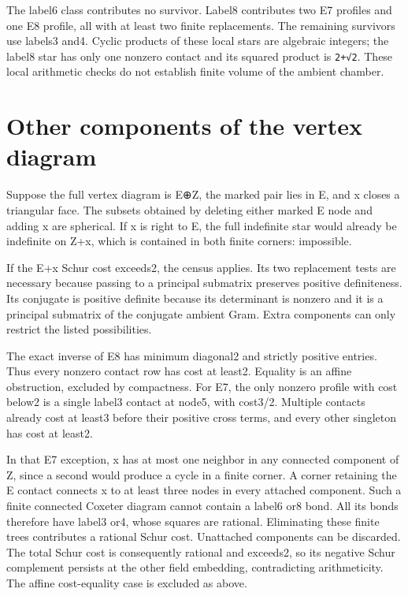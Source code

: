 \documentclass[
  10pt,
]{report}
\begin{document}
The label6 class contributes no survivor. Label8 contributes two E7
profiles and one E8 profile, all with at least two finite replacements.
The remaining survivors use labels3 and4. Cyclic products of these local
stars are algebraic integers; the label8 star has only one nonzero
contact and its squared product is \texttt{2+√2}. These local arithmetic
checks do not establish finite volume of the ambient chamber.

\section{Other components of the vertex
diagram}\label{other-components-of-the-vertex-diagram}

Suppose the full vertex diagram is E⊕Z, the marked pair lies in E, and x
closes a triangular face. The subsets obtained by deleting either marked
E node and adding x are spherical. If x is right to E, the full
indefinite star would already be indefinite on Z+x, which is contained
in both finite corners: impossible.

If the E+x Schur cost exceeds2, the census applies. Its two replacement
tests are necessary because passing to a principal submatrix preserves
positive definiteness. Its conjugate is positive definite because its
determinant is nonzero and it is a principal submatrix of the conjugate
ambient Gram. Extra components can only restrict the listed
possibilities.

The exact inverse of E8 has minimum diagonal2 and strictly positive
entries. Thus every nonzero contact row has cost at least2. Equality is
an affine obstruction, excluded by compactness. For E7, the only nonzero
profile with cost below2 is a single label3 contact at node5, with
cost3/2. Multiple contacts already cost at least3 before their positive
cross terms, and every other singleton has cost at least2.

In that E7 exception, x has at most one neighbor in any connected
component of Z, since a second would produce a cycle in a finite corner.
A corner retaining the E contact connects x to at least three nodes in
every attached component. Such a finite connected Coxeter diagram cannot
contain a label6 or8 bond. All its bonds therefore have label3 or4,
whose squares are rational. Eliminating these finite trees contributes a
rational Schur cost. Unattached components can be discarded. The total
Schur cost is consequently rational and exceeds2, so its negative Schur
complement persists at the other field embedding, contradicting
arithmeticity. The affine cost-equality case is excluded as above.
\end{document}

